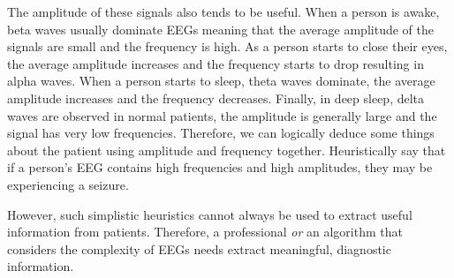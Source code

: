 The amplitude of these signals also tends to be useful. When a person is awake, beta waves usually dominate EEGs meaning that the average amplitude of the signals are small and the frequency is high. As a person starts to close their eyes, the average amplitude increases and the frequency starts to drop resulting in alpha waves. When a person starts to sleep, theta waves dominate, the average amplitude increases and the frequency decreases. Finally, in deep sleep, delta waves are observed in normal patients, the amplitude is generally large and the signal has very low frequencies. Therefore, we can logically deduce some things about the patient using amplitude and frequency together.  Heuristically say that if a person's EEG contains high frequencies and high amplitudes, they may be experiencing a seizure. 

However, such simplistic heuristics cannot always be used to extract useful information from patients. Therefore,  a professional \textit{or} an algorithm that considers the complexity of EEGs needs extract meaningful, diagnostic information.